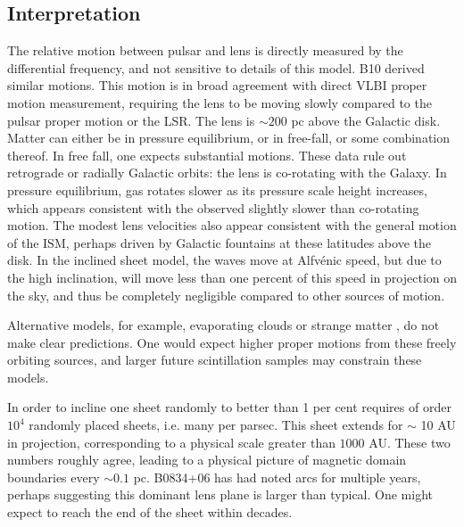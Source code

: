 \documentclass[useAMS,usenatbib]{mn2e}
\begin{document}
\subsection{Interpretation}

The relative motion between pulsar and lens is directly measured by
the differential frequency, and not sensitive to details of this
model. B10 derived similar motions.  This
motion is in broad agreement with direct VLBI proper motion
measurement, requiring the lens to be moving slowly compared to the
pulsar proper motion or the LSR.  The lens is $\sim200$ pc above the
Galactic disk.  Matter can either be in pressure equilibrium, or in
free-fall, or some combination thereof.  In free fall, one expects
substantial motions.  These data rule out retrograde or radially
Galactic orbits: the lens is co-rotating with the Galaxy.  In pressure
equilibrium, gas rotates slower as its pressure scale height
increases, which appears consistent with the observed slightly slower
than co-rotating motion.  The modest lens velocities also appear
consistent with the general motion of the ISM, perhaps driven by
Galactic fountains \citep{1976ApJ...205..762S} at these latitudes above
the disk.  In the inclined sheet model, the waves move at Alfv\'enic
speed, but due to the high inclination, will move less than one percent of this
speed in projection on the sky, and thus be completely negligible compared to
other sources of motion.

Alternative models, for example, evaporating
clouds \citep{1998ApJ...498L.125W} or strange
matter \citep{2013PhLB..727..357P}, do not make clear predictions.  One
would expect higher proper motions from these freely orbiting sources,
and larger future scintillation samples may constrain these models.

In order to incline one sheet randomly to better than 1 per cent requires of
order $10^4$ randomly placed sheets, i.e. many per parsec.  This sheet
extends for $\sim$ 10 AU in projection, corresponding to a physical
scale greater than $1000$ AU.   These two numbers roughly agree,
leading to a physical picture of magnetic domain boundaries every
$\sim 0.1$ pc.  B0834+06 has had noted arcs for multiple years,
perhaps suggesting this dominant lens plane is larger than typical.
One might expect to reach the end of the sheet within decades.
\end{document}
